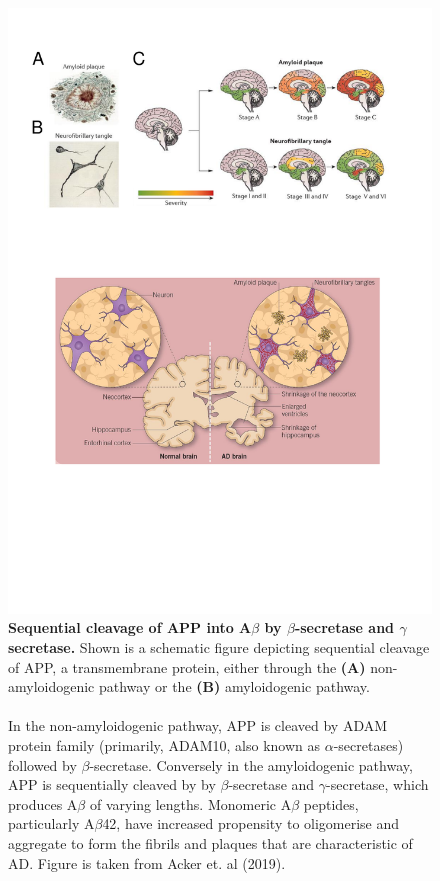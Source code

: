 \begin{figure}[!htp]
	\centering
	\includegraphics[page=2,trim={0.5cm 9cm 0cm 14.5cm},clip, scale = 0.8]{Figures/Introduction_Figures.pdf}
	\captionsetup{width=0.95\textwidth,singlelinecheck=off}
	\caption[Amyloid cascade hypothesis]%
	{\textbf{Sequential cleavage of APP into A$\beta$ by $\beta$-secretase and $\gamma$ secretase.} Shown is a schematic figure depicting sequential cleavage of APP, a transmembrane protein, either through the \textbf{(A)} non-amyloidogenic pathway or the \textbf{(B)} amyloidogenic pathway.
	\\
	\\
	In the non-amyloidogenic pathway, APP is cleaved by ADAM protein family (primarily, ADAM10, also known as $\alpha$-secretases) followed by $\beta$-secretase. Conversely in the amyloidogenic pathway, APP is sequentially cleaved by by $\beta$-secretase and $\gamma$-secretase, which produces A$\beta$ of varying lengths. Monomeric A$\beta$ peptides, particularly A$\beta$42, have increased propensity to oligomerise and aggregate to form the fibrils and plaques that are characteristic of AD. Figure is taken from Acker et. al (2019)\cite{Acker2019}. 
	}
	\label{fig:APP_Processing}
\end{figure}

